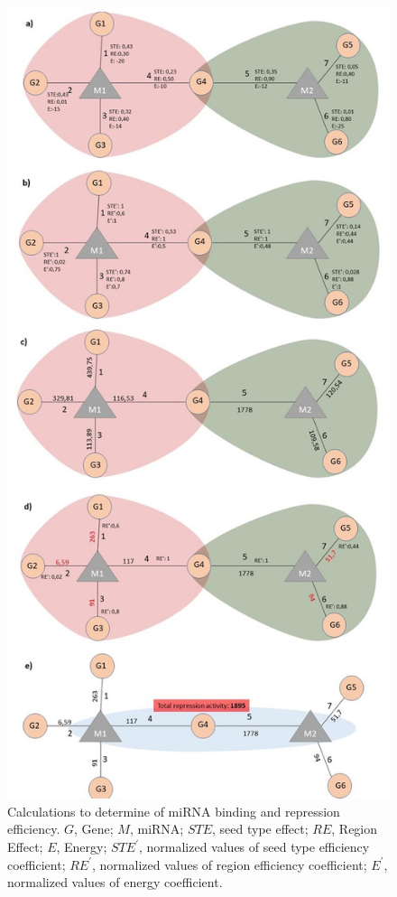 \documentclass[]{article}
\begin{document}
\begin{figure}
\hypertarget{fig2}{%
\centering
\includegraphics{fig2.jpg}
\caption{Calculations to determine of miRNA binding and repression
efficiency. \(G\), Gene; \(M\), miRNA; \(STE\), seed type effect;
\(RE\), Region Effect; \(E\), Energy; \(STE^\prime\), normalized values
of seed type efficiency coefficient; \(RE^\prime\), normalized values of
region efficiency coefficient; \(E^\prime\), normalized values of energy
coefficient.}\label{fig2}
}
\end{figure}
\end{document}

